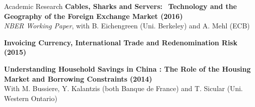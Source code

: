 \documentclass[usegeometry, 10pt, a4paper]{cv} %
\newcommand{\activite}[1]{\textbf{#1}\ }
\begin{document}
\begin{rubriquetableau}[0.95\textwidth]{Academic Research}
\activite{Cables, Sharks and Servers:}
\activite{Technology and the Geography of the Foreign Exchange Market (2016)}\\
\hspace{0.6cm} \small{\emph{NBER Working Paper}, with B. Eichengreen (Uni. Berkeley) and A. Mehl (ECB)}
\vspace{0.4cm} 
    
\activite{Invoicing Currency, International Trade and Redenomination Risk (2015)} \\
\vspace{0.2cm} 

\activite{Understanding Household Savings in China : The Role of the Housing Market and Borrowing Constraints (2014)}  \\
\hspace{0.6cm} \small{With M. Bussiere, Y. Kalantzis (both Banque de France) and T. Sicular (Uni. Western
  Ontario)} \\
\end{rubriquetableau}



\vspace{0.8cm}
\end{document}
